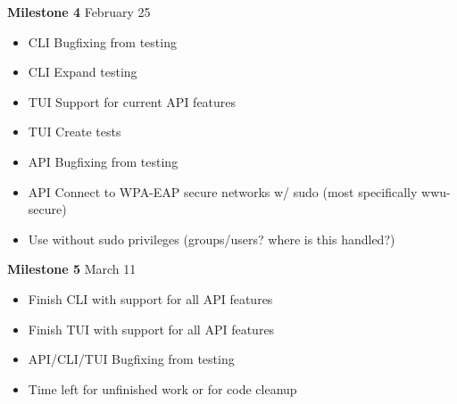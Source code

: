 \documentclass[11pt]{article}
\begin{document}
\textbf{Milestone 4} February 25
\begin{itemize}
  \item CLI Bugfixing from testing
  \item CLI Expand testing
  \item TUI Support for current API features
  \item TUI Create tests
  \item API Bugfixing from testing
  \item API Connect to WPA-EAP secure networks w/ sudo (most specifically wwu-secure)
  \item Use without sudo privileges (groups/users? where is this handled?)
\end{itemize}

\textbf{Milestone 5} March 11
\begin{itemize}
  \item Finish CLI with support for all API features
  \item Finish TUI with support for all API features
  \item API/CLI/TUI Bugfixing from testing
  \item Time left for unfinished work or for code cleanup
\end{itemize}
\end{document}
